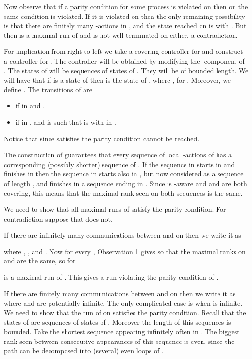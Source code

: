 \documentclass[10pt,a4paper]{article}
\begin{document}
  Now observe that if a parity condition for some process  is
  violated on  then on  the same condition is violated. If
  it is violated on  then the only remaining possibility is that
  there are finitely many -actions in , and the state reached on
   is  with . But then  is a maximal run
  of  and is not well terminated on  either, a
  contradiction.

  For implication from right to left we take a covering controller 
  for  and construct a controller  for . The
  controller  will be obtained by modifying the -component of
  .  The states of  will be sequences of states
  of . They will be of bounded length. We will have that
  if  is a state of  then
   is the state  of ,
  where  , for . Moreover, we define . The transitions of  are
  \begin{itemize}
  \item \quad if  in  and . 
  \item \quad if  in ,  and  is such that  is
     with   in . 
  \end{itemize}
  Notice that since  satisfies the parity condition 
  cannot be reached.

\medskip

\begin{remark}
The construction of  guarantees that
  every sequence of local -actions  of  has a corresponding
  (possibly shorter) sequence  of . If the sequence in
   starts in  and finishes in  then the sequence
  in  starts also in , but now considered as a sequence of
  length , and finishes in a sequence ending in . Since 
  is -aware and  and  are both covering, this
  means that the maximal rank seen on both sequences is the same.
  
\end{remark}

  We need to show that all maximal runs of  satisfy the
  parity condition. For contradiction suppose that  does not.

  If there are infinitely many communications between  and  on
   then we write it as
 
  where , , and . Now for every , Observation 1 gives 
  so that the maximal ranks on  and  are the same, so for
   
   is a maximal run of . This gives a run
  violating the parity condition of .

  If there are finitely many communications between  and  on
   then we write it as
   where  and  are potentially infinite. The
  only complicated case is when  is infinite. We need to show that
  the run of  on  satisfies the parity condition. Recall
  that the states of  are  sequences of states of
  . Moreover the length of this 
  sequences is bounded. Take the shortest sequence appearing infinitely
  often in . The biggest rank seen between consecutive appearances of this
  sequence is even, since the path can be decomposed into
  (several) even loops of .
\end{document}
